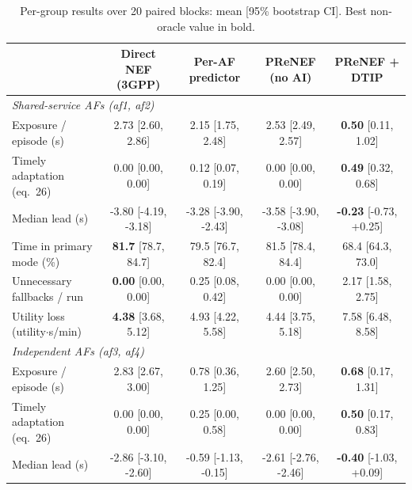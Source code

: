 \begin{table}[t]
\centering
\small
\caption{Per-group results over 20 paired blocks: mean [95\% bootstrap CI]. Best non-oracle value in bold.}
\label{tab:main}
\setlength{\tabcolsep}{4pt}
\begin{tabular}{lcccc}
\toprule
 & Direct NEF (3GPP) & Per-AF predictor & PReNEF (no AI) & PReNEF + DTIP \\
\midrule
\multicolumn{5}{l}{\textit{Shared-service AFs (af1, af2)}} \\
\quad Exposure / episode (s) & 2.73 {\scriptsize[2.60, 2.86]} & 2.15 {\scriptsize[1.75, 2.48]} & 2.53 {\scriptsize[2.49, 2.57]} & \textbf{0.50} {\scriptsize[0.11, 1.02]} \\
\quad Timely adaptation (eq.~26) & 0.00 {\scriptsize[0.00, 0.00]} & 0.12 {\scriptsize[0.07, 0.19]} & 0.00 {\scriptsize[0.00, 0.00]} & \textbf{0.49} {\scriptsize[0.32, 0.68]} \\
\quad Median lead (s) & -3.80 {\scriptsize[-4.19, -3.18]} & -3.28 {\scriptsize[-3.90, -2.43]} & -3.58 {\scriptsize[-3.90, -3.08]} & \textbf{-0.23} {\scriptsize[-0.73, +0.25]} \\
\quad Time in primary mode (\%) & \textbf{81.7} {\scriptsize[78.7, 84.7]} & 79.5 {\scriptsize[76.7, 82.4]} & 81.5 {\scriptsize[78.4, 84.4]} & 68.4 {\scriptsize[64.3, 73.0]} \\
\quad Unnecessary fallbacks / run & \textbf{0.00} {\scriptsize[0.00, 0.00]} & 0.25 {\scriptsize[0.08, 0.42]} & 0.00 {\scriptsize[0.00, 0.00]} & 2.17 {\scriptsize[1.58, 2.75]} \\
\quad Utility loss (utility$\cdot$s/min) & \textbf{4.38} {\scriptsize[3.68, 5.12]} & 4.93 {\scriptsize[4.22, 5.58]} & 4.44 {\scriptsize[3.75, 5.18]} & 7.58 {\scriptsize[6.48, 8.58]} \\
\midrule
\multicolumn{5}{l}{\textit{Independent AFs (af3, af4)}} \\
\quad Exposure / episode (s) & 2.83 {\scriptsize[2.67, 3.00]} & 0.78 {\scriptsize[0.36, 1.25]} & 2.60 {\scriptsize[2.50, 2.73]} & \textbf{0.68} {\scriptsize[0.17, 1.31]} \\
\quad Timely adaptation (eq.~26) & 0.00 {\scriptsize[0.00, 0.00]} & 0.25 {\scriptsize[0.00, 0.58]} & 0.00 {\scriptsize[0.00, 0.00]} & \textbf{0.50} {\scriptsize[0.17, 0.83]} \\
\quad Median lead (s) & -2.86 {\scriptsize[-3.10, -2.60]} & -0.59 {\scriptsize[-1.13, -0.15]} & -2.61 {\scriptsize[-2.76, -2.46]} & \textbf{-0.40} {\scriptsize[-1.03, +0.09]} \\

\end{tabular}
\end{table}
